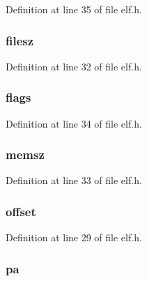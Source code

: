 Definition at line 35 of file elf.\-h.

\hypertarget{structproghdr_af68648ec9784a595235d016a78d4e443}{
\subsubsection[{filesz}]{ filesz}}\label{structproghdr_af68648ec9784a595235d016a78d4e443}


Definition at line 32 of file elf.\-h.

\hypertarget{structproghdr_a660f9db871d26052904976a8bfe8432d}{
\subsubsection[{flags}]{ flags}}\label{structproghdr_a660f9db871d26052904976a8bfe8432d}


Definition at line 34 of file elf.\-h.

\hypertarget{structproghdr_adda66e6aa36c4d480d9a96db0653f1c0}{
\subsubsection[{memsz}]{ memsz}}\label{structproghdr_adda66e6aa36c4d480d9a96db0653f1c0}


Definition at line 33 of file elf.\-h.

\hypertarget{structproghdr_abb6eef28c6175ceaae40067c5761fb3c}{
\subsubsection[{offset}]{ offset}}\label{structproghdr_abb6eef28c6175ceaae40067c5761fb3c}


Definition at line 29 of file elf.\-h.

\hypertarget{structproghdr_adc03a600d1b3918826d34dfb0c4bf1ab}{
\subsubsection[{pa}]{ pa}}\label{structproghdr_adc03a600d1b3918826d34dfb0c4bf1ab}


